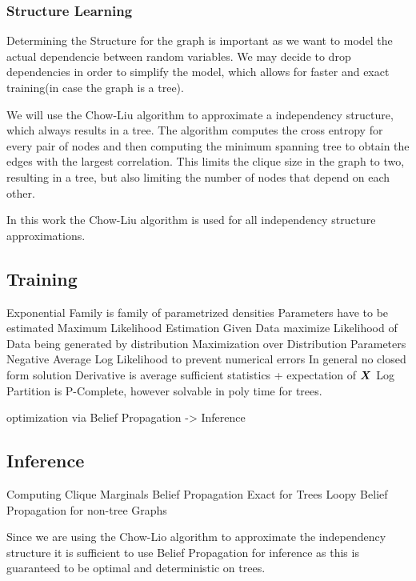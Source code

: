\subsubsection{Structure Learning}
    Determining the Structure for the graph is important as we want to model the actual dependencie
    between random variables. 
    We may decide to drop dependencies in order to simplify the model, which allows for faster and exact training(in case the graph is a tree).
    
    We will use the Chow-Liu algorithm to approximate a independency structure, which always results in a tree.
    The algorithm computes the cross entropy for every pair of nodes and then computing the minimum spanning tree to 
    obtain the edges with the largest correlation.
    This limits the clique size in the graph to two, resulting in a tree, but also limiting the number of nodes that depend on each other.

    In this work the Chow-Liu algorithm is used for all independency structure approximations.
\subsection{Training}
\label{ssec:train}

Exponential Family is family of parametrized densities
Parameters have to be estimated
Maximum Likelihood Estimation
Given Data maximize Likelihood of Data being generated by distribution
Maximization over Distribution Parameters 
Negative Average Log Likelihood to prevent numerical errors
In general no closed form solution
Derivative is average sufficient statistics + expectation of $\boldsymbol{X}$
Log Partition is P-Complete, however solvable in poly time for trees.

optimization via Belief Propagation -> Inference
\subsection{Inference}
\label{ssec:inf}

Computing Clique Marginals
Belief Propagation
Exact for Trees 
Loopy Belief Propagation for non-tree Graphs

Since we are using the Chow-Lio algorithm to approximate the independency structure it is sufficient to use Belief Propagation for inference as this is guaranteed to be optimal and deterministic on trees.

